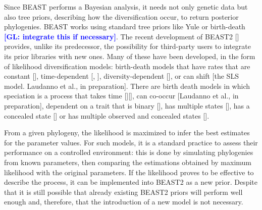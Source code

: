 \documentclass{article}
\newcommand{\giovanni}[1]{\textcolor{blue}{\textbf{[GL: #1]}}}
\begin{document}
Since BEAST performs a Bayesian analysis, 
it needs not only genetic data but also tree priors, 
describing how the diversification occur, to return posterior phylogenies.
BEAST works using standard tree priors like Yule or birth-death 
\giovanni{integrate this if necessary}.
The recent development of BEAST2 [\cite{bouckaert2014beast}] provides, 
unlike its predecessor, the possibility for third-party users 
to integrate its prior libraries with new ones. 
Many of these have been developed, 
in the form of likelihood diversification models: 
birth-death models that have rates that are 
constant [\cite{nee1994reconstructed}], 
time-dependent [\cite{nee1994reconstructed}, \cite{rabosky2008explosive}], 
diversity-dependent [\cite{etienne2011diversity}],
or can shift [the SLS model. Laudanno et al., in preparation].
There are birth death models in which speciation is a process that 
takes time [\cite{rosindell2010protracted}][\cite{etienne2012prolonging}],
can co-occur [Laudanno et al., in preparation],
dependent on a trait that is binary [\cite{maddison2007estimating}], 
has multiple states [\cite{fitzjohn2012diversitree}],
has a concealed state [\cite{beaulieu2016detecting}] 
or has multiple observed and concealed states [\cite{herrera2018detecting}]. 

From a given phylogeny, the likelihood is maximized
to infer the best estimates for the parameter values.
For such  models, it is a standard practice to assess their performance 
on a controlled environment: this is done by simulating phylogenies from known parameters, 
then comparing the estimations obtained by maximum likelihood with the original parameters.
If the likelihood proves to be effective to describe the process, 
it can be implemented into BEAST2 as a new prior. 
Despite that it is still possible that already existing BEAST2 priors 
will perform well enough and, therefore, 
that the introduction of a new model is not necessary.
\end{document}
